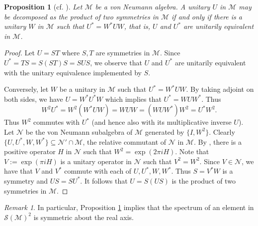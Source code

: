 \documentclass[12pt, preprint]{amsart}
\newtheorem{prop}[thm]{Proposition}
\theoremstyle{definition}
\theoremstyle{remark}
\newtheorem{remark}[thm]{Remark}
\numberwithin{equation}{section}
\theoremstyle{ser}
\theoremstyle{serr}
\theoremstyle{ser}
\begin{document}
\begin{prop}[cf. {\cite[Theorem 3]{radjavi_williams}}]
\label{prop:prod-two-symm}
{\sl Let $\mathscr{M}$ be a von Neumann algebra. A unitary $U$ in $\mathscr{M}$ may be decomposed as the product of two symmetries in $\mathscr{M}$ if and only if there is a unitary $W$ in $\mathscr{M}$ such that $U^* = W^*UW$, that is, $U$ and $U^*$ are unitarily equivalent in $\mathscr{M}$. }
\end{prop}
\begin{proof}
Let $U = ST$ where $S, T$ are symmetries in $\mathscr{M}$. Since $U^* = TS = S(ST)S = SUS$, we observe that $U$ and $U^*$ are unitarily equivalent with the unitary equivalence implemented by $S$.

Conversely, let $W$ be a unitary in $\mathscr{M}$ such that $U^* = W^*UW$. By taking adjoint on both sides, we have $U = W^* U^* W$ which implies that $U^* = WUW^*$. Thus $$W^2U^* = W^2 (W^*UW) = WUW = (WUW^*) W^2 =  U^* W^2.$$ Thus $W^2$ commutes with $U^*$ (and hence also with its multiplicative inverse $U$). Let $\mathscr{N}$ be the von Neumann subalgebra of $\mathscr{M}$ generated by $\{I, W^2 \}$. Clearly $\{ U, U^*, W, W^* \} \subseteq \mathscr{N}' \cap \mathscr{M}$, the relative commutant of $\mathscr{N}$ in $\mathscr{M}$. By \cite[Theorem 5.2.5]{kadison-ringrose1}, there is a positive operator $H$ in $\mathscr{N}$ such that $W^2 = \exp(2 \pi i H)$. Note that $V := \exp( \pi i H)$ is a unitary operator in $\mathscr{N}$ such that $V^2 = W^2$. Since $V \in \mathscr{N}$, we have that $V$ and $V^*$ commute with each of $U, U^*, W, W^*$. Thus $S = V^* W$ is a symmetry and $US = SU^* $. It follows that $U = S(US)$ is the product of two symmetries in $\mathscr{M}$.
\end{proof}



\begin{remark}
\label{rmrk:prod_two_symm}
In particular, Proposition \ref{prop:prod-two-symm} implies that the spectrum of an element in $\mathcal{S}(\mathscr{M})^2$ is symmetric about the real axis.
\end{remark}
\end{document}
